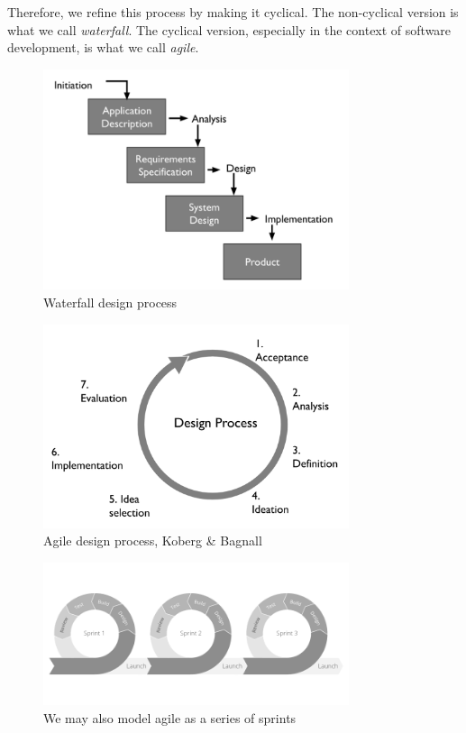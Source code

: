 \documentclass[12pt]{article}
\begin{document}
Therefore, we refine this process by making it cyclical. The non-cyclical version is what we call \textit{waterfall}. The cyclical version, especially in the context of software development, is what we call \textit{agile}.

\begin{figure}[htbp]
  \centering
  \includegraphics[width=0.8\textwidth]{waterfall.png}
  \caption{Waterfall design process}
\end{figure}

\begin{figure}[htbp]
  \centering
  \includegraphics[width=0.8\textwidth]{agile.png}
  \caption{Agile design process, Koberg \& Bagnall}
\end{figure}

\begin{figure}[htbp]
  \centering
  \includegraphics[width=0.8\textwidth]{agile-series.png}
  \caption{We may also model agile as a series of sprints}
\end{figure}
\end{document}
